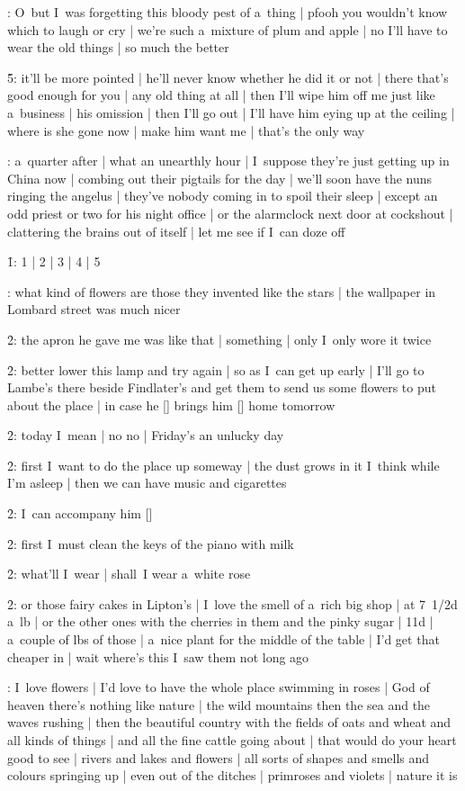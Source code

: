 :
O~but I~was forgetting this bloody pest of a~thing |
pfooh you wouldn't know which to laugh or cry |
we're such a~mixture of plum and apple |
no I'll have to wear the old things |
so much the better

\f5:
it'll be more pointed |
he'll never know whether he did it or not |
there that's good enough for you |
any old thing at all |
then I'll wipe him off me just like a~business |
his omission |
then I'll go out |
I'll have him eying up at the ceiling |
where is she gone now |
make him want me |
that's the only way

:
a~quarter after |
what an unearthly hour |
I~suppose they're just getting up in China now |
combing out their pigtails for the day |
we'll soon have the nuns ringing the angelus |
they've nobody coming in to spoil their sleep |
except an odd priest or two for his night office |
or the alarmclock next door at cockshout |
clattering the brains out of itself |
let me see if I~can doze off

\f1:
1 | 2 | 3 | 4 | 5

:
what kind of flowers are those they invented like the stars |
the wallpaper in Lombard street was much nicer

\f2:
the apron he gave me was like that |
something |
only I~only wore it twice

\f2:
better lower this lamp and try again |
so as I~can get up early |
I'll go to Lambe's there beside Findlater's
and get them to send us some flowers to put about the place |
in case he [\bloom] brings him [\stephen] home tomorrow

\f2:
today I~mean |
no no |
Friday's an unlucky day

\f2:
first I~want to do the place up someway |
the dust grows in it I~think while I'm asleep |
then we can have music and cigarettes

\f2:
I~can accompany him [\stephen]

\f2:
first I~must clean the keys of the piano with milk

\f2:
what'll I~wear |
shall~I wear a~white rose

\f2:
or those fairy cakes in Lipton's |
I~love the smell of a~rich big shop |
at 7~1/2d a~lb |
or the other ones with the cherries in them and the pinky sugar |
11d |
a~couple of lbs of those |
a~nice plant for the middle of the table |
I'd get that cheaper in |
wait where's this I~saw them not long ago

:
I~love flowers |
I'd love to have the whole place swimming in roses |
God of heaven there's nothing like nature |
the wild mountains then the sea and the waves rushing |
then the beautiful country
with the fields of oats and wheat and all kinds of things |
and all the fine cattle going about |
that would do your heart good to see |
rivers and lakes and flowers |
all sorts of shapes and smells and colours springing up |
even out of the ditches |
primroses and violets |
nature it is

